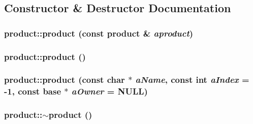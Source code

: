 \subsection{Constructor \& Destructor Documentation}
\hypertarget{classproduct_ac130281dfe8e31f86305414d45527a83}{
\subsubsection[{product}]{\setlength{\rightskip}{0pt plus 5cm}product::product (const {\bf product} \& {\em aproduct})}}
\label{classproduct_ac130281dfe8e31f86305414d45527a83}
\hypertarget{classproduct_aeb2cf841e901baf1488c1779dfe665b7}{
\subsubsection[{product}]{\setlength{\rightskip}{0pt plus 5cm}product::product ()}}
\label{classproduct_aeb2cf841e901baf1488c1779dfe665b7}
\hypertarget{classproduct_ab81620d4367bf48de48c8ccad77570a4}{
\subsubsection[{product}]{\setlength{\rightskip}{0pt plus 5cm}product::product (const char $\ast$ {\em aName}, \/  const int {\em aIndex} = {\ttfamily -\/1}, \/  const {\bf base} $\ast$ {\em aOwner} = {\ttfamily NULL})}}
\label{classproduct_ab81620d4367bf48de48c8ccad77570a4}
\hypertarget{classproduct_a089282937d729c1374710166c0398c98}{
\subsubsection[{$\sim$product}]{\setlength{\rightskip}{0pt plus 5cm}product::$\sim$product ()}}
\label{classproduct_a089282937d729c1374710166c0398c98}


